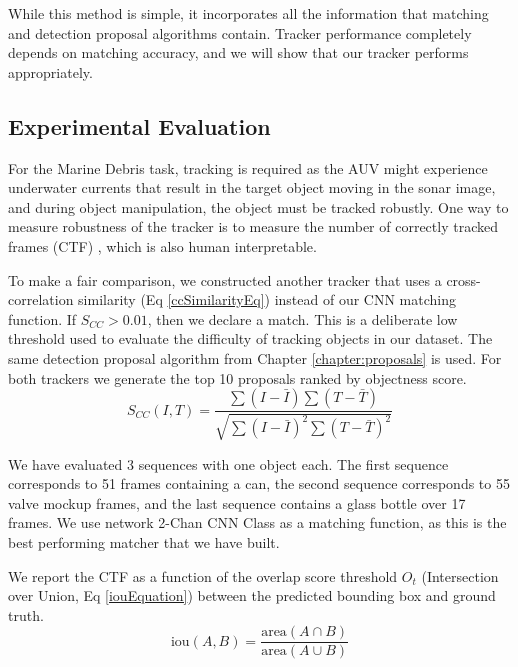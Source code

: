 While this method is simple, it incorporates all the information that matching and detection proposal algorithms contain. Tracker performance completely depends on matching accuracy, and we will show that our tracker performs appropriately.

\subsection{Experimental Evaluation}

For the Marine Debris task, tracking is required as the AUV might experience underwater currents that result in the target object moving in the sonar image, and during object manipulation, the object must be tracked robustly. One way to measure robustness of the tracker is to measure the number of correctly tracked frames (CTF) \cite{vcehovin2016visual}, which is also human interpretable.

To make a fair comparison, we constructed another tracker that uses a cross-correlation similarity (Eq \ref{ccSimilarityEq}) instead of our CNN matching function. If $S_{CC} > 0.01$, then we declare a match. This is a deliberate low threshold used to evaluate the difficulty of tracking objects in our dataset. The same detection proposal algorithm from Chapter \ref{chapter:proposals} is used. For both trackers we generate the top 10 proposals ranked by objectness score.
\vspace*{1em}
\begin{equation}
S_{CC}(I, T) = \frac{\sum (I - \bar{I}) \sum (T - \bar{T})}{\sqrt{\sum (I - \bar{I})^2 \sum (T - \bar{T})^2}}
\label{ccSimilarityEq}
\end{equation}

We have evaluated 3 sequences with one object each. The first sequence corresponds to 51 frames containing a can, the second sequence corresponds to 55 valve mockup frames, and the last sequence contains a glass bottle over 17 frames. We use network 2-Chan CNN Class as a matching function, as this is the best performing matcher that we have built.

We report the CTF as a function of the overlap score threshold $O_t$ (Intersection over Union,  Eq \ref{iouEquation}) between the predicted bounding box and ground truth.
\vspace*{1em}
\begin{equation}
\text{iou}(A, B) = \frac{\text{area}(A \cap B)}{\text{area}(A \cup B)}
\label{iouEquation}
\end{equation}

